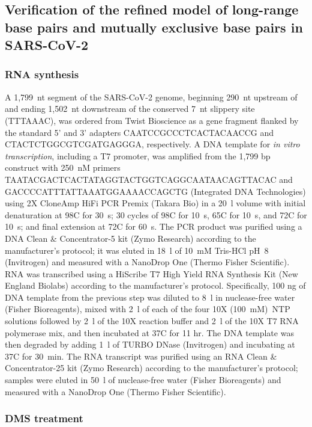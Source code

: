 \documentclass[main.tex]{subfiles}
\begin{document}
\subsection{Verification of the refined model of long-range base pairs and mutually exclusive base pairs in SARS-CoV-2}

\subsubsection{RNA synthesis}

A 1,799~nt segment of the SARS-CoV-2 genome, beginning 290~nt upstream of and ending 1,502~nt downstream of the conserved 7~nt slippery site (TTTAAAC), was ordered from Twist Bioscience as a gene fragment flanked by the standard 5' and 3' adapters CAATCCGCCCTCACTACAACCG and CTACTCTGGCGTCGATGAGGGA, respectively.
A DNA template for \textit{in vitro transcription}, including a T7 promoter, was amplified from the 1,799 bp construct with 250~nM primers TAATACGACTCACTATAGGTACTGGTCAGGCAATAACAGTTACAC and GACCCCATTTATTAAATGGAAAACCAGCTG (Integrated DNA Technologies) using 2X CloneAmp HiFi PCR Premix (Takara Bio) in a 20~\textmu l volume with initial denaturation at 98\textdegree C for 30~s; 30 cycles of 98\textdegree C for 10~s, 65\textdegree C for 10~s, and 72\textdegree C for 10~s; and final extension at 72\textdegree C for 60~s.
The PCR product was purified using a DNA Clean \& Concentrator-5 kit (Zymo Research) according to the manufacturer's protocol; it was eluted in 18~\textmu l of 10~mM Tris-HCl pH~8 (Invitrogen) and measured with a NanoDrop One (Thermo Fisher Scientific).
RNA was transcribed using a HiScribe T7 High Yield RNA Synthesis Kit (New England Biolabs) according to the manufacturer's protocol.
Specifically, 100 ng of DNA template from the previous step was diluted to 8~\textmu l in nuclease-free water (Fisher Bioreagents), mixed with 2~\textmu l of each of the four 10X (100~mM)~NTP solutions followed by 2~\textmu l of the 10X reaction buffer and 2~\textmu l of the 10X T7 RNA polymerase mix, and then incubated at 37\textdegree C for 11 hr.
The DNA template was then degraded by adding 1~\textmu l of TURBO DNase (Invitrogen) and incubating at 37\textdegree C for 30~min.
The RNA transcript was purified using an RNA Clean \& Concentrator-25 kit (Zymo Research) according to the manufacturer's protocol; samples were eluted in 50~\textmu l of nuclease-free water (Fisher Bioreagents) and measured with a NanoDrop One (Thermo Fisher Scientific).

\subsubsection{DMS treatment}
\end{document}

